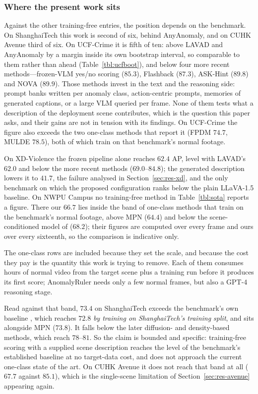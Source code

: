 \documentclass[a4paper,fleqn]{cas-sc}
\begin{document}
\subsubsection{Where the present work sits}
Against the other training-free entries, the position depends on the benchmark.
On ShanghaiTech this work is second of six, behind AnyAnomaly, and on CUHK
Avenue third of six. On UCF-Crime it is fifth of ten: above LAVAD and AnyAnomaly
by a margin inside its own bootstrap interval, so comparable to them rather than
ahead (Table~\ref{tbl:ucfboot}), and below four more recent methods---frozen-VLM
yes/no scoring ($85.3$), Flashback ($87.3$), ASK-Hint ($89.8$) and NOVA
($89.9$). Those methods invest in the text and the reasoning side: prompt banks
written per anomaly class, action-centric prompts, memories of generated
captions, or a large VLM queried per frame. None of them tests what a
description of the deployment scene contributes, which is the question this
paper asks, and their gains are not in tension with its findings. On UCF-Crime
the figure also exceeds the two one-class methods that report it (FPDM $74.7$,
MULDE $78.5$), both of which train on that benchmark's normal footage.

On XD-Violence the frozen pipeline alone reaches $62.4$ AP, level with LAVAD's
$62.0$ and below the more recent methods ($69.0$--$84.8$); the generated
description lowers it to $41.7$, the failure analysed in
Section~\ref{sec:res-xd}, and the only benchmark on which the proposed
configuration ranks below the plain LLaVA-1.5 baseline. On NWPU Campus no
training-free method in Table~\ref{tbl:sota} reports a figure. There our $66.7$
lies inside the band of one-class methods that train on the benchmark's normal
footage, above MPN ($64.4$) and below the scene-conditioned model of
\citet{cao2023nwpu} ($68.2$); their figures are computed over every frame and
ours over every sixteenth, so the comparison is indicative only.

The one-class rows are included because they set the scale, and because the
cost they pay is the quantity this work is trying to remove. Each of them
consumes hours of normal video from the target scene plus a training run before
it produces its first score; AnomalyRuler needs only a few normal frames, but
also a GPT-4 reasoning stage.

Read against that band, $73.4$ on ShanghaiTech exceeds the benchmark's own
baseline \citep{liu2018shanghaitech}, which reaches $72.8$ \emph{by training on
ShanghaiTech's training split}, and sits alongside MPN ($73.8$). It falls below
the later diffusion- and density-based methods, which reach $78$--$81$. So the
claim is bounded and specific: training-free scoring with a supplied scene
description reaches the level of the benchmark's established baseline at no
target-data cost, and does not approach the current one-class state of the art.
On CUHK Avenue it does not reach that band at all ($67.7$ against $85.1$), which
is the single-scene limitation of Section~\ref{sec:res-avenue} appearing again.
\end{document}
